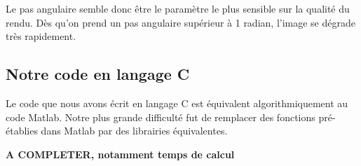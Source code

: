 \documentclass[conference]{IEEEtran}
\begin{document}
Le pas angulaire semble donc être le paramètre le plus sensible sur la qualité du rendu. Dès qu'on prend un pas angulaire supérieur à 1 radian, l'image se dégrade très rapidement.

\subsection{Notre code en langage C}

Le code que nous avons écrit en langage C est équivalent algorithmiquement au code Matlab. Notre plus grande difficulté fut de remplacer des fonctions pré-établies dans Matlab par des librairies équivalentes.

\textbf{A COMPLETER, notamment temps de calcul}


%
%



%
%
\end{document}
